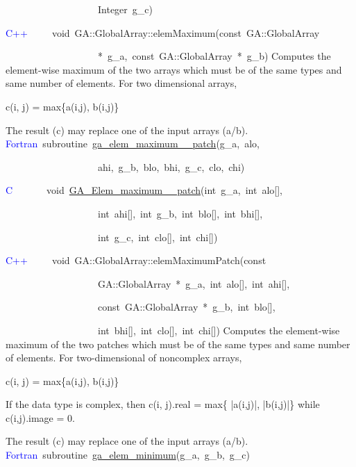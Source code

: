 ~~~~~~~~~~~~~~~~~~~Integer~g\_c)

\textcolor{blue}{C++}~~~~~void~GA::GlobalArray::elemMaximum(const~GA::GlobalArray~

~~~~~~~~~~~~~~~~~~~{*}~g\_a,~const~GA::GlobalArray~{*}~g\_b)
Computes the element-wise maximum of the two arrays which must be
of the same types and same number of elements. For two dimensional
arrays,

c(i, j) = max\{a(i,j), b(i,j)\}

The result (c) may replace one of the input arrays (a/b). 
\textcolor{blue}{Fortran}~subroutine~\href{http://www.emsl.pnl.gov/docs/global/ga_ops.html\#ga_elem_maximum_patch}{ga\_{}elem\_{}maximum\_{}\_{}patch}(g\_a,~alo,

~~~~~~~~~~~~~~~~~~~ahi,~g\_b,~blo,~bhi,~g\_c,~clo,~chi)~

\textcolor{blue}{C}~~~~~~~void~\href{http://www.emsl.pnl.gov/docs/global/c_nga_ops.html\#ga_elem_maximum_patch}{GA\_{}Elem\_{}maximum\_{}\_{}patch}(int~g\_a,~int~alo{[}{]},

~~~~~~~~~~~~~~~~~~~int~ahi{[}{]},~int~g\_b,~int~blo{[}{]},~int~bhi{[}{]},~

~~~~~~~~~~~~~~~~~~~int~g\_c,~int~clo{[}{]},~int~chi{[}{]})

\textcolor{blue}{C++}~~~~~void~GA::GlobalArray::elemMaximumPatch(const~

~~~~~~~~~~~~~~~~~~~GA::GlobalArray~{*}~g\_a,~int~alo{[}{]},~int~ahi{[}{]},~

~~~~~~~~~~~~~~~~~~~const~GA::GlobalArray~{*}~g\_b,~int~blo{[}{]},~

~~~~~~~~~~~~~~~~~~~int~bhi{[}{]},~int~clo{[}{]},~int~chi{[}{]})
Computes the element-wise maximum of the two patches which must be
of the same types and same number of elements. For two-dimensional
of noncomplex arrays,

c(i, j) = max\{a(i,j), b(i,j)\}

If the data type is complex, then c(i, j).real = max\{ |a(i,j)|, |b(i,j)|\}
while c(i,j).image = 0.

The result (c) may replace one of the input arrays (a/b). 
\textcolor{blue}{Fortran}~subroutine~\href{http://www.emsl.pnl.gov/docs/global/ga_ops.html\#ga_elem_minimum}{ga\_{}elem\_{}minimum}(g\_a,~g\_b,~g\_c)~

